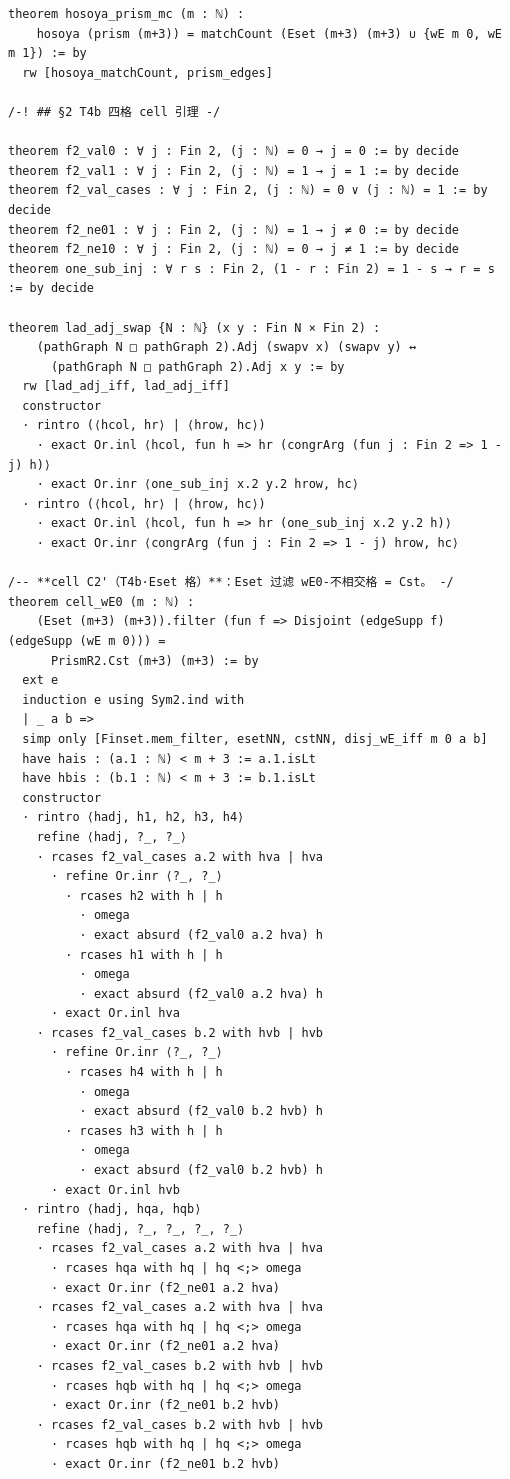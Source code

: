 \documentclass[11pt]{article}
\begin{document}
\begin{lstlisting}
theorem hosoya_prism_mc (m : ℕ) :
    hosoya (prism (m+3)) = matchCount (Eset (m+3) (m+3) ∪ {wE m 0, wE m 1}) := by
  rw [hosoya_matchCount, prism_edges]

/-! ## §2 T4b 四格 cell 引理 -/

theorem f2_val0 : ∀ j : Fin 2, (j : ℕ) = 0 → j = 0 := by decide
theorem f2_val1 : ∀ j : Fin 2, (j : ℕ) = 1 → j = 1 := by decide
theorem f2_val_cases : ∀ j : Fin 2, (j : ℕ) = 0 ∨ (j : ℕ) = 1 := by decide
theorem f2_ne01 : ∀ j : Fin 2, (j : ℕ) = 1 → j ≠ 0 := by decide
theorem f2_ne10 : ∀ j : Fin 2, (j : ℕ) = 0 → j ≠ 1 := by decide
theorem one_sub_inj : ∀ r s : Fin 2, (1 - r : Fin 2) = 1 - s → r = s := by decide

theorem lad_adj_swap {N : ℕ} (x y : Fin N × Fin 2) :
    (pathGraph N □ pathGraph 2).Adj (swapv x) (swapv y) ↔
      (pathGraph N □ pathGraph 2).Adj x y := by
  rw [lad_adj_iff, lad_adj_iff]
  constructor
  · rintro (⟨hcol, hr⟩ | ⟨hrow, hc⟩)
    · exact Or.inl ⟨hcol, fun h => hr (congrArg (fun j : Fin 2 => 1 - j) h)⟩
    · exact Or.inr ⟨one_sub_inj x.2 y.2 hrow, hc⟩
  · rintro (⟨hcol, hr⟩ | ⟨hrow, hc⟩)
    · exact Or.inl ⟨hcol, fun h => hr (one_sub_inj x.2 y.2 h)⟩
    · exact Or.inr ⟨congrArg (fun j : Fin 2 => 1 - j) hrow, hc⟩

/-- **cell C2'（T4b·Eset 格）**：Eset 过滤 wE0-不相交格 = Cst。 -/
theorem cell_wE0 (m : ℕ) :
    (Eset (m+3) (m+3)).filter (fun f => Disjoint (edgeSupp f) (edgeSupp (wE m 0))) =
      PrismR2.Cst (m+3) (m+3) := by
  ext e
  induction e using Sym2.ind with
  | _ a b =>
  simp only [Finset.mem_filter, esetNN, cstNN, disj_wE_iff m 0 a b]
  have hais : (a.1 : ℕ) < m + 3 := a.1.isLt
  have hbis : (b.1 : ℕ) < m + 3 := b.1.isLt
  constructor
  · rintro ⟨hadj, h1, h2, h3, h4⟩
    refine ⟨hadj, ?_, ?_⟩
    · rcases f2_val_cases a.2 with hva | hva
      · refine Or.inr ⟨?_, ?_⟩
        · rcases h2 with h | h
          · omega
          · exact absurd (f2_val0 a.2 hva) h
        · rcases h1 with h | h
          · omega
          · exact absurd (f2_val0 a.2 hva) h
      · exact Or.inl hva
    · rcases f2_val_cases b.2 with hvb | hvb
      · refine Or.inr ⟨?_, ?_⟩
        · rcases h4 with h | h
          · omega
          · exact absurd (f2_val0 b.2 hvb) h
        · rcases h3 with h | h
          · omega
          · exact absurd (f2_val0 b.2 hvb) h
      · exact Or.inl hvb
  · rintro ⟨hadj, hqa, hqb⟩
    refine ⟨hadj, ?_, ?_, ?_, ?_⟩
    · rcases f2_val_cases a.2 with hva | hva
      · rcases hqa with hq | hq <;> omega
      · exact Or.inr (f2_ne01 a.2 hva)
    · rcases f2_val_cases a.2 with hva | hva
      · rcases hqa with hq | hq <;> omega
      · exact Or.inr (f2_ne01 a.2 hva)
    · rcases f2_val_cases b.2 with hvb | hvb
      · rcases hqb with hq | hq <;> omega
      · exact Or.inr (f2_ne01 b.2 hvb)
    · rcases f2_val_cases b.2 with hvb | hvb
      · rcases hqb with hq | hq <;> omega
      · exact Or.inr (f2_ne01 b.2 hvb)


\end{lstlisting}
\end{document}
